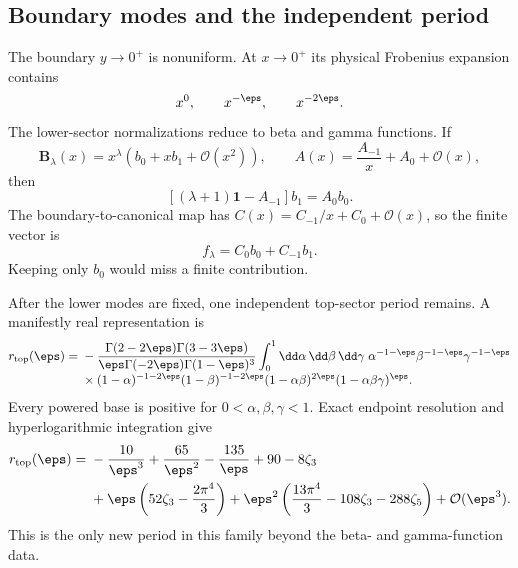 \subsection{Boundary modes and the independent period}

The boundary $y\to0^+$ is nonuniform.  At $x\to0^+$ its physical
Frobenius expansion contains
\begin{equation}
 x^0,
 \qquad x^{-\eps},
 \qquad x^{-2\eps}.
 \label{eq:nnlo-boundary-modes}
\end{equation}
The lower-sector normalizations reduce to beta and gamma functions.  If
\begin{equation}
 \boldsymbol B_\lambda(x)
 =x^\lambda(b_0+xb_1+\mathcal O(x^2)),
 \qquad
 A(x)=\frac{A_{-1}}{x}+A_0+\mathcal O(x),
 \label{eq:nnlo-frobenius-expansion}
\end{equation}
then
\begin{equation}
 \left[(\lambda+1)\mathbf1-A_{-1}\right]b_1=A_0b_0.
 \label{eq:nnlo-frobenius-recurrence}
\end{equation}
The boundary-to-canonical map has
$C(x)=C_{-1}/x+C_0+\mathcal O(x)$, so the finite vector is
\begin{equation}
 f_\lambda=C_0b_0+C_{-1}b_1.
 \label{eq:nnlo-finite-boundary-match}
\end{equation}
Keeping only $b_0$ would miss a finite contribution.

After the lower modes are fixed, one independent top-sector period remains.
A manifestly real representation is
\begin{align}
 r_{\rm top}(\eps)={}&-
 \frac{\Gamma(2-2\eps)\Gamma(3-3\eps)}
      {\eps\Gamma(-2\eps)\Gamma(1-\eps)^3}
 \int_0^1\dd\alpha\,\dd\beta\,\dd\gamma\;
 \alpha^{-1-\eps}\beta^{-1-\eps}\gamma^{-1-\eps}
 \notag\\[-1mm]
 &\times(1-\alpha)^{-1-2\eps}(1-\beta)^{-1-2\eps}
 (1-\alpha\beta)^{2\eps}(1-\alpha\beta\gamma)^\eps.
 \label{eq:nnlo-corner-period}
\end{align}
Every powered base is positive for $0<\alpha,\beta,\gamma<1$.  Exact
endpoint resolution and hyperlogarithmic integration give
\begin{align}
 r_{\rm top}(\eps)={}&-\frac{10}{\eps^3}
 +\frac{65}{\eps^2}-\frac{135}{\eps}+90-8\zeta_3
 \notag\\
 &+\eps\left(52\zeta_3-\frac{2\pi^4}{3}\right)
 +\eps^2\left(\frac{13\pi^4}{3}-108\zeta_3-288\zeta_5\right)
 +\mathcal O(\eps^3).
 \label{eq:nnlo-corner-period-series}
\end{align}
This is the only new period in this family beyond the beta- and gamma-function
data.

